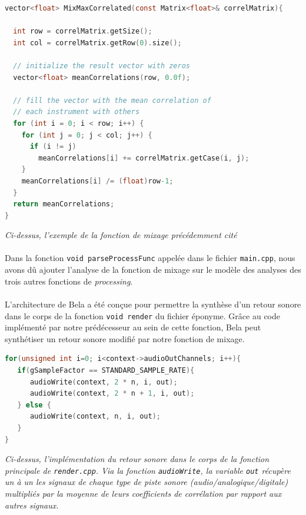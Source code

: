 \begin{lstlisting}[language=C, frame=single, breaklines=true]
vector<float> MixMaxCorrelated(const Matrix<float>& correlMatrix){

  int row = correlMatrix.getSize();
  int col = correlMatrix.getRow(0).size();

  // initialize the result vector with zeros
  vector<float> meanCorrelations(row, 0.0f);

  // fill the vector with the mean correlation of
  // each instrument with others
  for (int i = 0; i < row; i++) {
    for (int j = 0; j < col; j++) {
      if (i != j)
        meanCorrelations[i] += correlMatrix.getCase(i, j);
    }
    meanCorrelations[i] /= (float)row-1;
  }
  return meanCorrelations;
}
\end{lstlisting}

\begin{center}
 \textit{Ci-dessus, l'exemple de la fonction de mixage précédemment cité}
\end{center}

\paragraph{}
Dans la fonction \verb!void parseProcessFunc!  appelée dans le fichier
\verb!main.cpp!, nous avons dû ajouter l'analyse de la fonction de
mixage sur le modèle des analyses des trois autres fonctions de
\textit{processing}.

\paragraph{}
L'architecture de Bela a été conçue pour permettre la synthèse d'un
retour sonore dans le corps de la fonction \verb!void render! du
fichier éponyme. Grâce au code implémenté par notre prédécesseur au
sein de cette fonction, Bela peut synthétiser un retour sonore modifié
par notre fonction de mixage.

\begin{lstlisting}[language=C, frame=single, breaklines=true]
for(unsigned int i=0; i<context->audioOutChannels; i++){
   if(gSampleFactor == STANDARD_SAMPLE_RATE){
      audioWrite(context, 2 * n, i, out);
      audioWrite(context, 2 * n + 1, i, out);
   } else {
      audioWrite(context, n, i, out);
   }
}
\end{lstlisting}

\begin{center} \textit{Ci-dessus, l'implémentation du retour sonore
  dans le corps de la fonction principale de \verb!render.cpp!. Via la
  fonction \verb!audioWrite!, la variable \verb!out! récupère un à un
  les signaux de chaque type de piste sonore
  (audio/analogique/digitale) multipliés par la moyenne de leurs
  coefficients de corrélation par rapport aux autres
  signaux.} \end{center}

